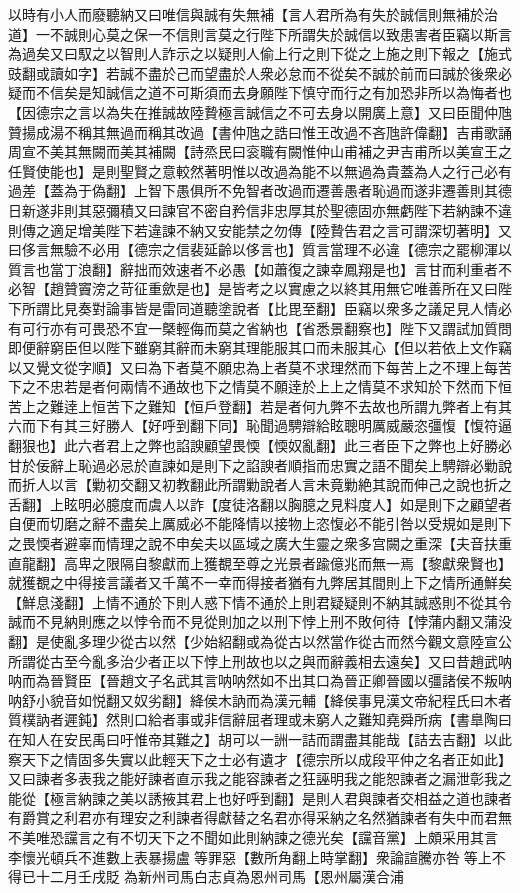 以時有小人而廢聽納又曰唯信與誠有失無補【言人君所為有失於誠信則無補於治道】一不誠則心莫之保一不信則言莫之行陛下所謂失於誠信以致患害者臣竊以斯言為過矣又曰馭之以智則人詐示之以疑則人偷上行之則下從之上施之則下報之【施式豉翻或讀如字】若誠不盡於己而望盡於人衆必怠而不從矣不誠於前而曰誠於後衆必疑而不信矣是知誠信之道不可斯須而去身願陛下慎守而行之有加恐非所以為悔者也【因德宗之言以為失在推誠故陸贄極言誠信之不可去身以開廣上意】又曰臣聞仲虺贊揚成湯不稱其無過而稱其改過【書仲虺之誥曰惟王改過不吝虺許偉翻】吉甫歌誦周宣不美其無闕而美其補闕【詩烝民曰衮職有闕惟仲山甫補之尹吉甫所以美宣王之任賢使能也】是則聖賢之意較然著明惟以改過為能不以無過為貴蓋為人之行己必有過差【蓋為于偽翻】上智下愚俱所不免智者改過而遷善愚者恥過而遂非遷善則其德日新遂非則其惡彌積又曰諫官不密自矜信非忠厚其於聖德固亦無虧陛下若納諫不違則傳之適足增美陛下若違諫不納又安能禁之勿傳【陸贄告君之言可謂深切著明】又曰侈言無驗不必用【德宗之信裴延齡以侈言也】質言當理不必違【德宗之罷柳渾以質言也當丁浪翻】辭拙而效速者不必愚【如蕭復之諫幸鳳翔是也】言甘而利重者不必智【趙贊竇滂之苛征重歛是也】是皆考之以實慮之以終其用無它唯善所在又曰陛下所謂比見奏對論事皆是雷同道聽塗說者【比毘至翻】臣竊以衆多之議足見人情必有可行亦有可畏恐不宜一槩輕侮而莫之省納也【省悉景翻察也】陛下又謂試加質問即便辭窮臣但以陛下雖窮其辭而未窮其理能服其口而未服其心【但以若依上文作竊以又覺文從字順】又曰為下者莫不願忠為上者莫不求理然而下每苦上之不理上每苦下之不忠若是者何兩情不通故也下之情莫不願逹於上上之情莫不求知於下然而下恒苦上之難逹上恒苦下之難知【恒戶登翻】若是者何九弊不去故也所謂九弊者上有其六而下有其三好勝人【好呼到翻下同】恥聞過騁辯給眩聰明厲威嚴恣彊愎【愎符逼翻狠也】此六者君上之弊也諂諛顧望畏愞【愞奴亂翻】此三者臣下之弊也上好勝必甘於佞辭上恥過必忌於直諫如是則下之諂諛者順指而忠實之語不聞矣上騁辯必勦說而折人以言【勦初交翻又初教翻此所謂勦說者人言未竟勦絶其說而伸己之說也折之舌翻】上眩明必臆度而虞人以詐【度徒洛翻以胸臆之見料度人】如是則下之顧望者自便而切磨之辭不盡矣上厲威必不能降情以接物上恣愎必不能引咎以受規如是則下之畏愞者避辜而情理之說不申矣夫以區域之廣大生靈之衆多宫闕之重深【夫音扶重直龍翻】高卑之限隔自黎獻而上獲覩至尊之光景者踰億兆而無一焉【黎獻衆賢也】就獲覩之中得接言議者又千萬不一幸而得接者猶有九弊居其間則上下之情所通鮮矣【鮮息淺翻】上情不通於下則人惑下情不通於上則君疑疑則不納其誠惑則不從其令誠而不見納則應之以悖令而不見從則加之以刑下悖上刑不敗何待【悖蒲内翻又蒲没翻】是使亂多理少從古以然【少始紹翻或為從古以然當作從古而然今觀文意陸宣公所謂從古至今亂多治少者正以下悖上刑故也以之與而辭義相去遠矣】又曰昔趙武呐呐而為晉賢臣【晉趙文子名武其言呐呐然如不出其口為晉正卿晉國以彊諸侯不叛呐呐舒小貌音如悦翻又奴劣翻】絳侯木訥而為漢元輔【絳侯事見漢文帝紀程氏曰木者質樸訥者遲鈍】然則口給者事或非信辭屈者理或未窮人之難知堯舜所病【書臯陶曰在知人在安民禹曰吁惟帝其難之】胡可以一詶一詰而謂盡其能哉【詰去吉翻】以此察天下之情固多失實以此輕天下之士必有遺才【德宗所以成段平仲之名者正如此】又曰諫者多表我之能好諫者直示我之能容諫者之狂誣明我之能恕諫者之漏泄彰我之能從【極言納諫之美以誘掖其君上也好呼到翻】是則人君與諫者交相益之道也諫者有爵賞之利君亦有理安之利諫者得獻替之名君亦得采納之名然猶諫者有失中而君無不美唯恐讜言之有不切天下之不聞如此則納諫之德光矣【讜音黨】上頗采用其言　李懷光頓兵不進數上表暴揚盧等罪惡【數所角翻上時掌翻】衆論諠騰亦咎等上不得已十二月壬戌貶為新州司馬白志貞為恩州司馬【恩州屬漢合浦
